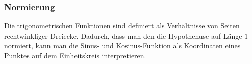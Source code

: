 

%
%
\subsubsection{Normierung}
Die trigonometrischen Funktionen sind definiert als Verhältnisse 
von Seiten rechtwinkliger Dreiecke.
Dadurch, dass man den die Hypothenuse auf Länge $1$ normiert, 
kann man die Sinus- und Kosinus-Funktion als Koordinaten eines
Punktes auf dem Einheitskreis interpretieren.

